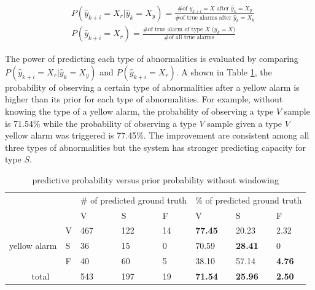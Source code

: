 {\begin{align}
\nonumber 
&P(\hat{y}_{k+i}=X_r|\hat{y}_{k}=X_y)=\frac{\text{\# of $y_{k+i}=X$ after $\hat{y}_k=X_y$}}{\text{\# of true alarms after $\hat{y}_k=X_y$}} \\
&P(\hat{y}_{k+i}=X_r)=\frac{\text{\# of true alarm of type $X$ ($y_{k}=X$)}}{\text{\# of all true alarms}} 
\end{align}

The power of predicting each type of abnormalities is evaluated by comparing $P(\hat{y}_{k+i}=X_r|\hat{y}_{k}=X_y)$ and $P(\hat{y}_{k+i}=X_r)$. A shown in Table \ref{table:pred}, the probability of observing a certain type of abnormalities after a yellow alarm is higher than its prior for each type of abnormalities. For example, without knowing the type of a yellow alarm, the probability of observing a type $V$ sample is 71.54\% while the probability of observing a type $V$ sample given a type $V$ yellow alarm was triggered is 77.45\%. The improvement are consistent among all three types of abnormalities but the system has stronger predicting capacity for type $S$. 

\begin{table}[t]
\centering
\caption{predictive probability versus prior probability without windowing}
\label{table:pred}
\begin{tabular}{|c|l|l|l|l||l|l|l|}
\hline
\multicolumn{2}{|l|}{\multirow{2}{*}{}} & \multicolumn{3}{l|}{\# of predicted ground truth} & \multicolumn{3}{l|}{\% of predicted ground truth} \\ \cline{3-8} 
\multicolumn{2}{|l|}{}                  & V               & S               & F             & V               & S               & F             \\ \hline
\multirow{3}{*}{yellow alarm}    & V    & 467             & 122              & 14            & \textbf{77.45}  & 20.23           & 2.32          \\ \cline{2-8} 
                                 & S    & 36              & 15              & 0             & 70.59           & \textbf{28.41}  & 0             \\ \cline{2-8} 
                                 & F    & 40              & 60              & 5             & 38.10           & 57.14           & \textbf{4.76} \\ \hline
\multicolumn{2}{|c|}{total}             & 543             & 197             & 19            & \textbf{71.54}  & \textbf{25.96}  & \textbf{2.50} \\ \hline
\end{tabular}
\end{table}

}
